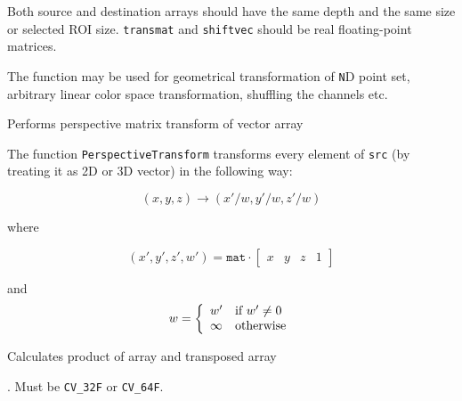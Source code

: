 Both source and destination arrays should have the same depth and the
same size or selected ROI size. \texttt{transmat} and \texttt{shiftvec}
should be real floating-point matrices.

The function may be used for geometrical transformation of \texttt{N}D
point set, arbitrary linear color space transformation, shuffling the
channels etc.


Performs perspective matrix transform of vector array


\begin{description}
\end{description}


The function \texttt{PerspectiveTransform} transforms every element of \texttt{src} (by treating it as 2D or 3D vector) in the following way:

\[ (x, y, z) \rightarrow (x'/w, y'/w, z'/w) \]

where

\[ (x', y', z', w') = \texttt{mat} \cdot
\begin{bmatrix}
x & y & z & 1
\end{bmatrix}
\]

and
\[ w = \left\{ \begin{array}{l l} w' & \mbox{if $w' \ne 0$}\\ \infty & \mbox{otherwise}\\ \end{array} \right. \]


Calculates product of array and transposed array


\begin{description}
. Must be \texttt{CV\_32F} or \texttt{CV\_64F}.
\end{description}

